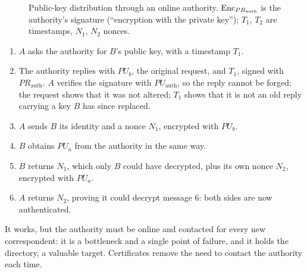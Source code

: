 \begin{figure}[H]
\centering
{}
\caption{Public-key distribution through an online authority. $\operatorname{Enc}_{PR_{\mathrm{auth}}}$ is the authority's signature (\enquote{encryption with the private key}); $T_1$, $T_2$ are timestamps, $N_1$, $N_2$ nonces.}
\label{fig:pk-authority}
\end{figure}

\begin{enumerate}
    \item $A$ asks the authority for $B$'s public key, with a timestamp $T_1$.
    \item The authority replies with $PU_b$, the original request, and $T_1$, signed with $PR_{\mathrm{auth}}$. $A$ verifies the signature with $PU_{\mathrm{auth}}$, so the reply cannot be forged; the request shows that it was not altered; $T_1$ shows that it is not an old reply carrying a key $B$ has since replaced.
    \item $A$ sends $B$ its identity and a nonce $N_1$, encrypted with $PU_b$.
    \item[4--5.] $B$ obtains $PU_a$ from the authority in the same way.
    \item[6.] $B$ returns $N_1$, which only $B$ could have decrypted, plus its own nonce $N_2$, encrypted with $PU_a$.
    \item[7.] $A$ returns $N_2$, proving it could decrypt message 6: both sides are now authenticated.
\end{enumerate}
It works, but the authority must be online and contacted for every new correspondent: it is a bottleneck and a single point of failure, and it holds the directory, a valuable target. Certificates remove the need to contact the authority each time.

